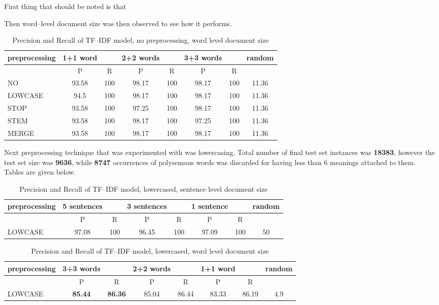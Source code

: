 First thing that should be noted is that  


Then word--level document size was then observed to see how it performs. 
\begin{table}[h!]
\begin{tabular}{ l | c c | c c | c c | c}
   preprocessing & 1+1 word && 2+2 words && 3+3 words  && random\\
\hline\hline
	& P  &  R & P  &  R & P  &  R &\\
\hline
 NO  & 93.58 & 100 & 98.17 & 100 & 98.17 & 100 & 11.36 \\
LOWCASE  & 94.5 & 100 & 98.17 & 100 & 98.17 & 100 & 11.36  \\
STOP  & 93.58 & 100 & 97.25 & 100 & 98.17 & 100 & 11.36  \\
 STEM  & 93.58 & 100 & 98.17 & 100 & 97.25 & 100 & 11.36 \\
MERGE  & 93.58 & 100 & 98.17 & 100 & 98.17 & 100 & 11.36  \\
\end{tabular}
\caption{Precision and Recall of TF--IDF model, no preprocessing, word level document size}
\end{table}




Next preprocessing technique that was experimented with was lowercasing. Total number of final test set instances was \textbf{18383}, however the test set size was \textbf{9636}, while \textbf{8747} occurrences of polysemous words was discarded  for having less than 6 meanings attached to them. Tables are given below.
\begin{table}[h!]
\begin{tabular}{ l | c c | c c | c c | c}
   preprocessing &  5 sentences && 3 sentences && 1 sentence  && random\\
\hline
	& P  &  R & P  &  R & P  &  R &\\
\hline\hline
LOWCASE  & 97.08 & 100 & 96.45 & 100 & 97.09 & 100 & 50 \\
\end{tabular}
\caption{Precision and Recall of TF--IDF model, lowercased, sentence level document size}
\end{table}

\begin{table}[h!]
\begin{tabular}{ l | c c | c c | c c | c}
   preprocessing &  3+3 words && 2+2 words && 1+1 word  && random\\
\hline\hline
	& P  &  R & P  &  R & P  &  R &\\
\hline
LOWCASE  & \textbf{85.44}  &  \textbf{86.36} &  85.04 & 86.44 & 83.33  & 86.19  & 4.9 \\
\end{tabular}
\caption{Precision and Recall of TF--IDF model, lowercased, word level document size}
\end{table}

